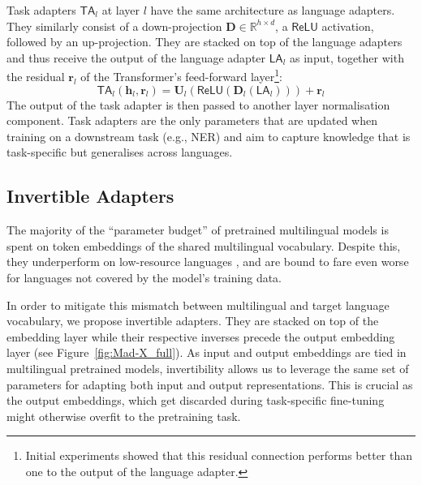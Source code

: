 \documentclass[11pt,a4paper]{article}
\begin{document}
Task adapters $\mathsf{TA}_l$ at layer $l$ have the same architecture as language adapters. They similarly consist of a down-projection $\textbf{D} \in \mathbb{R}^{h \times d}$, a $\mathsf{ReLU}$ activation, followed by an up-projection. They are stacked on top of the language adapters and thus receive the output of the language adapter $\mathsf{LA}_l$ as input, together with the residual $\mathbf{r}_l$ of the Transformer's feed-forward layer\footnote{Initial experiments showed that this residual connection performs better than one to the output of the language adapter.}:
\begin{equation}
\mathsf{TA}_l(\textbf{h}_l, \textbf{r}_l) = \textbf{U}_l(\mathsf{ReLU}(\textbf{D}_l(\mathsf{LA}_l))) + \textbf{r}_l
\end{equation}
\noindent The output of the task adapter is then passed to another layer normalisation component. Task adapters are the only parameters that are updated when training on a downstream task (e.g., NER) and aim to capture knowledge that is task-specific but generalises across languages.

 
\subsection{Invertible Adapters}
\label{sec:invertible_adapters}

The majority of the ``parameter budget'' of pretrained multilingual models is spent on token embeddings of the shared multilingual vocabulary. Despite this, they underperform on low-resource languages \cite{Artetxe2020cross-lingual,Conneau2020xlm-r}, and are bound to fare even worse for languages not covered by the model's training data.  

In order to mitigate this mismatch between multilingual and target language vocabulary, we propose invertible adapters. They are stacked on top of the embedding layer while their respective inverses precede the output embedding layer (see Figure~\ref{fig:Mad-X_full}).  As input and output embeddings are tied in multilingual pretrained models, invertibility allows us to leverage the same set of parameters for adapting both input and output representations. This is crucial as the output embeddings, which get discarded during task-specific fine-tuning might otherwise overfit to the pretraining task. 
\end{document}
